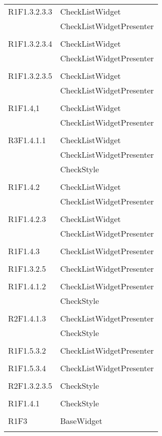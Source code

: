 \begin{center}
\begin{longtable}{|p{7cm}|p{5cm}|}
		R1F1.3.2.3.3 & CheckListWidget \\ & CheckListWidgetPresenter \\ & \\ \hline
		R1F1.3.2.3.4 & CheckListWidget \\ & CheckListWidgetPresenter \\ & \\ \hline
		R1F1.3.2.3.5 & CheckListWidget \\ & CheckListWidgetPresenter \\ & \\ \hline
		R1F1.4,1 & CheckListWidget \\ & CheckListWidgetPresenter \\ & \\ \hline
		R3F1.4.1.1 & CheckListWidget \\ & CheckListWidgetPresenter \\ & CheckStyle \\ & \\ \hline
		R1F1.4.2 & CheckListWidget \\ & CheckListWidgetPresenter \\ & \\ \hline
		R1F1.4.2.3 & CheckListWidget \\ & CheckListWidgetPresenter \\ & \\ \hline
		R1F1.4.3 & CheckListWidgetPresenter \\ & \\ \hline
		R1F1.3.2.5 & CheckListWidgetPresenter \\ & \\ \hline
		R1F1.4.1.2 & CheckListWidgetPresenter \\ & CheckStyle \\ & \\ \hline
		R2F1.4.1.3 & CheckListWidgetPresenter \\ & CheckStyle \\ & \\ \hline
		R1F1.5.3.2 & CheckListWidgetPresenter \\ & \\ \hline
		R1F1.5.3.4 & CheckListWidgetPresenter \\ & \\ \hline
		R2F1.3.2.3.5 & CheckStyle \\ & \\ \hline
		R1F1.4.1 & CheckStyle \\ & \\ \hline
		R1F3 & BaseWidget \\ & \\ \hline

\end{longtable}
\end{center}
